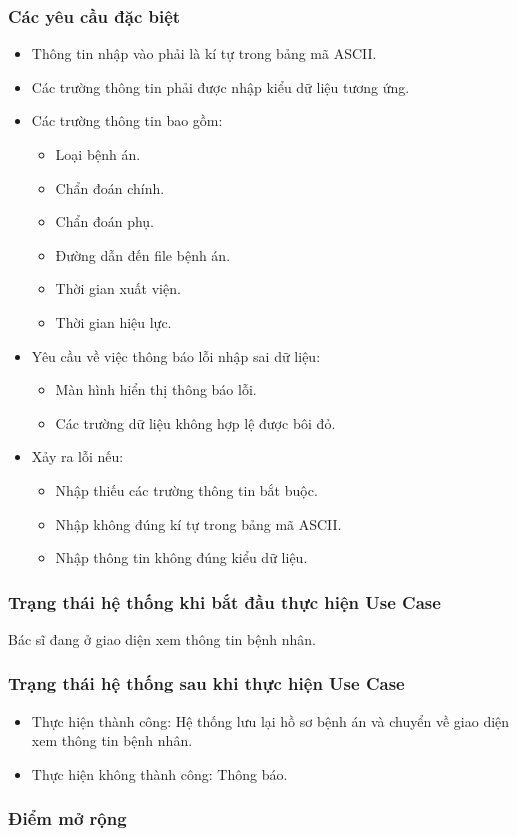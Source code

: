 \subsubsection{Các yêu cầu đặc biệt}
\begin{itemize}
    \item Thông tin nhập vào phải là kí tự trong bảng mã ASCII.
    \item Các trường thông tin phải được nhập kiểu dữ liệu tương ứng.
    \item Các trường thông tin bao gồm:
    \begin{itemize}
        \item Loại bệnh án.
        \item Chẩn đoán chính.
        \item Chẩn đoán phụ.
        \item Đường dẫn đến file bệnh án.
        \item Thời gian xuất viện.
        \item Thời gian hiệu lực.
    \end{itemize}
    \item Yêu cầu về việc thông báo lỗi nhập sai dữ liệu:
    \begin{itemize}
        \item Màn hình hiển thị thông báo lỗi.
        \item Các trường dữ liệu không hợp lệ được bôi đỏ.
    \end{itemize}
    \item Xảy ra lỗi nếu:
    \begin{itemize}
        \item Nhập thiếu các trường thông tin bắt buộc.
        \item Nhập không đúng kí tự trong bảng mã ASCII.
        \item Nhập thông tin không đúng kiểu dữ liệu.
    \end{itemize}
\end{itemize}

\subsubsection{Trạng thái hệ thống khi bắt đầu thực hiện Use Case}
Bác sĩ đang ở giao diện xem thông tin bệnh nhân.

\subsubsection{Trạng thái hệ thống sau khi thực hiện Use Case}
\begin{itemize}
    \item Thực hiện thành công: Hệ thống lưu lại hồ sơ bệnh án và chuyển về giao diện xem thông tin bệnh nhân.
    \item Thực hiện không thành công: Thông báo.
\end{itemize}

\subsubsection{Điểm mở rộng}